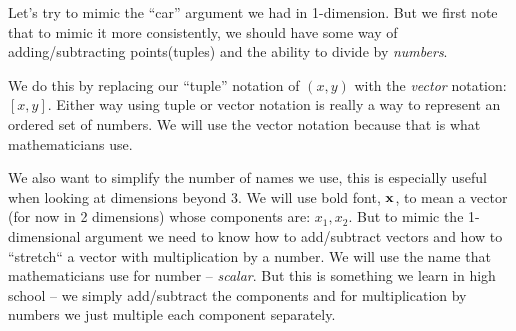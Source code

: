 \documentclass[12pt]{article}
\begin{document}
Let's try to mimic the ``car'' argument we had in 1-dimension. But we first 
note that to mimic it more consistently, we should have some way of adding/subtracting
points(tuples) and the ability to divide by {\em numbers\/}.

We do this by replacing our ``tuple'' notation of $(x,y)$ with the {\em vector\/}
notation: $[x, y]$. Either way using tuple or vector notation is really
a way to represent an ordered set of numbers. We will use the vector notation
because that is what mathematicians use. 

We also want to simplify the number of names we use, this is especially useful
when looking at dimensions beyond 3. We will use bold font, ${\bf x}$, to mean 
a vector (for now in 2 dimensions) whose components are: $x_1, x_2$.
But to mimic the 1-dimensional argument
we need to know how to add/subtract vectors and how to ``stretch`` a vector with 
multiplication by a number. We will use the name that mathematicians use for number -- {\em scalar\/}.
But this is something we learn in high school -- we simply add/subtract the components 
and for multiplication by numbers we just multiple each component separately. 
\end{document}
